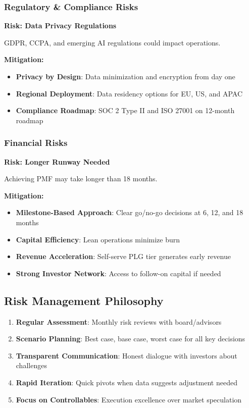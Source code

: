 \subsubsection{Regulatory \& Compliance Risks}

\textbf{Risk: Data Privacy Regulations}

GDPR, CCPA, and emerging AI regulations could impact operations.

\textbf{Mitigation:}
\begin{itemize}[noitemsep]
    \item \textbf{Privacy by Design}: Data minimization and encryption from day one
    \item \textbf{Regional Deployment}: Data residency options for EU, US, and APAC
    \item \textbf{Compliance Roadmap}: SOC 2 Type II and ISO 27001 on 12-month roadmap
\end{itemize}

\subsubsection{Financial Risks}

\textbf{Risk: Longer Runway Needed}

Achieving PMF may take longer than 18 months.

\textbf{Mitigation:}
\begin{itemize}[noitemsep]
    \item \textbf{Milestone-Based Approach}: Clear go/no-go decisions at 6, 12, and 18 months
    \item \textbf{Capital Efficiency}: Lean operations minimize burn
    \item \textbf{Revenue Acceleration}: Self-serve PLG tier generates early revenue
    \item \textbf{Strong Investor Network}: Access to follow-on capital if needed
\end{itemize}

\subsection{Risk Management Philosophy}

\begin{enumerate}[noitemsep]
    \item \textbf{Regular Assessment}: Monthly risk reviews with board/advisors
    \item \textbf{Scenario Planning}: Best case, base case, worst case for all key decisions
    \item \textbf{Transparent Communication}: Honest dialogue with investors about challenges
    \item \textbf{Rapid Iteration}: Quick pivots when data suggests adjustment needed
    \item \textbf{Focus on Controllables}: Execution excellence over market speculation
\end{enumerate}
